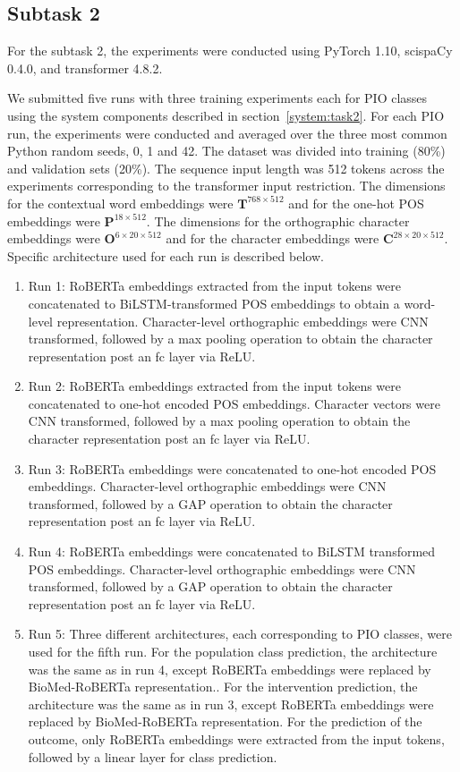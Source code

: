 \documentclass[11pt]{article}
\begin{document}
%
%
%
\subsection{Subtask 2}
\label{exps:task2}
%
For the subtask 2, the experiments were conducted using PyTorch 1.10, scispaCy 0.4.0, and transformer 4.8.2.

We submitted five runs with three training experiments each for PIO classes using the system components described in section~\ref{system:task2}.
For each PIO run, the experiments were conducted and averaged over the three most common Python random seeds, 0, 1 and 42.
The dataset was divided into training (80\%) and validation sets (20\%).
The sequence input length was 512 tokens across the experiments corresponding to the transformer input restriction.
The dimensions for the contextual word embeddings were $\mathbf{T}^{768 \times 512}$ and for the one-hot POS embeddings were $\mathbf{P}^{18 \times 512}$.
The dimensions for the orthographic character embeddings were $\mathbf{O}^{6 \times 20 \times 512}$ and for the character embeddings were $\mathbf{C}^{28 \times 20 \times 512}$.
Specific architecture used for each run is described below.
%
\begin{enumerate}
    \item Run 1: RoBERTa embeddings extracted from the input tokens were concatenated to BiLSTM-transformed POS embeddings to obtain a word-level representation. Character-level orthographic embeddings were CNN transformed, followed by a max pooling operation to obtain the character representation post an fc layer via ReLU.
    \item Run 2: RoBERTa embeddings extracted from the input tokens were concatenated to one-hot encoded POS embeddings. Character vectors were CNN transformed, followed by a max pooling operation to obtain the character representation post an fc layer via ReLU.
    \item Run 3: RoBERTa embeddings were concatenated to one-hot encoded POS embeddings. Character-level orthographic embeddings were CNN transformed, followed by a GAP operation to obtain the character representation post an fc layer via ReLU.
    \item Run 4: RoBERTa embeddings were concatenated to BiLSTM transformed POS embeddings. Character-level orthographic embeddings were CNN transformed, followed by a GAP operation to obtain the character representation post an fc layer via ReLU.
    \item Run 5: Three different architectures, each corresponding to PIO classes, were used for the fifth run. For the population class prediction, the architecture was the same as in run 4, except RoBERTa embeddings were replaced by BioMed-RoBERTa representation.. For the intervention prediction, the architecture was the same as in run 3, except RoBERTa embeddings were replaced by BioMed-RoBERTa representation. For the prediction of the outcome, only RoBERTa embeddings were extracted from the input tokens, followed by a linear layer for class prediction. 
\end{enumerate}
\end{document}
